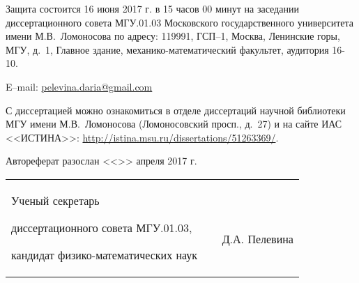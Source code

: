 \documentclass[a4paper,14pt,
oneside]{extbook}
\begin{document}
\noindent Защита состоится 16 июня 2017 г. в 15 часов 00 минут на
заседании диссертационного совета МГУ.01.03 Московского
государственного университета имени М.В.~Ломоносова по адресу:
119991, ГСП--1, Москва, Ленинские горы, МГУ, д.~1, Главное здание, механико-математический
факультет, аудитория 16-10.

\vsp

\noindent E--mail: \href{pelevina.daria@gmail.com}{pelevina.daria@gmail.com}

\vsp

\noindent С диссертацией можно ознакомиться в отделе диссертаций научной библиотеки МГУ имени М.В.~Ломоносова (Ломоносовский просп., д.~27) и на сайте ИАС <<ИСТИНА>>: \url{http://istina.msu.ru/dissertations/51263369/}.

\vsp

\noindent Автореферат разослан <<\underline{\hspace{1.0cm}}>> апреля 2017 г.

\vsp

\vfill

\noindent\begin{tabular}{@{}p{10cm}@{}p{4cm}@{}p{3.5cm}@{}}
Ученый секретарь

диссертационного совета МГУ.01.03,

кандидат физико-математических наук
 &
$\:$

 &
$\:$

$\:$

\raggedleft  Д.А. Пелевина\\
\end{tabular}

\newpage




\end{document}
